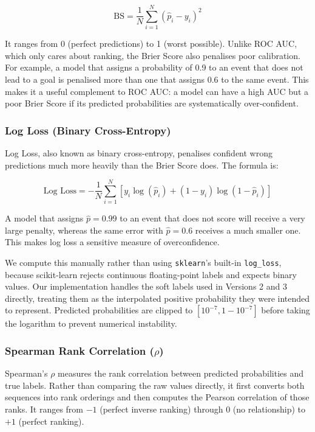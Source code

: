\documentclass{article}
\begin{document}
\[
\text{BS} = \frac{1}{N} \sum_{i=1}^{N} (\hat{p}_i - y_i)^2
\]

It ranges from 0 (perfect predictions) to 1 (worst possible). Unlike ROC AUC, which only cares about ranking, the Brier Score also penalises poor calibration. For example, a model that assigns a probability of 0.9 to an event that does not lead to a goal is penalised more than one that assigns 0.6 to the same event. This makes it a useful complement to ROC AUC: a model can have a high AUC but a poor Brier Score if its predicted probabilities are systematically over-confident.

\subsubsection{Log Loss (Binary Cross-Entropy)}

Log Loss, also known as binary cross-entropy, penalises confident wrong predictions much more heavily than the Brier Score does. The formula is:

\[
\text{Log Loss} = -\frac{1}{N} \sum_{i=1}^{N} \left[ y_i \log(\hat{p}_i) + (1 - y_i) \log(1 - \hat{p}_i) \right]
\]

A model that assigns $\hat{p} = 0.99$ to an event that does not score will receive a very large penalty, whereas the same error with $\hat{p} = 0.6$ receives a much smaller one. This makes log loss a sensitive measure of overconfidence.

We compute this manually rather than using \texttt{sklearn}'s built-in \texttt{log\_loss}, because scikit-learn rejects continuous floating-point labels and expects binary values. Our implementation handles the soft labels used in Versions 2 and 3 directly, treating them as the interpolated positive probability they were intended to represent. Predicted probabilities are clipped to $[10^{-7}, 1 - 10^{-7}]$ before taking the logarithm to prevent numerical instability.

\subsubsection{Spearman Rank Correlation ($\rho$)}

Spearman's $\rho$ measures the rank correlation between predicted probabilities and true labels. Rather than comparing the raw values directly, it first converts both sequences into rank orderings and then computes the Pearson correlation of those ranks. It ranges from $-1$ (perfect inverse ranking) through $0$ (no relationship) to $+1$ (perfect ranking).
\end{document}
